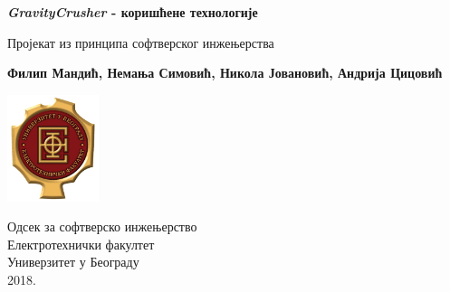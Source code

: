 \begin{titlepage}
    \begin{center}

        \vspace*{1cm}

        \Huge
        \textbf{\textit{GravityCrusher} - коришћене технологије}

        \vspace{0.5cm}
        \LARGE
        Пројекат из принципа софтверског инжењерства

        \vspace{1.5cm}
        \Large
        \textbf{Филип Мандић, Немања Симовић,
        Никола Јовановић, Андрија Цицовић}

        \vfill

        \includegraphics[width=0.2\textwidth]{../resources/etflogo}

        \large
        Одсек за софтверско инжењерство\\
        Електротехнички факултет\\
        Универзитет у Београду\\
        2018.

    \end{center}
\end{titlepage}
